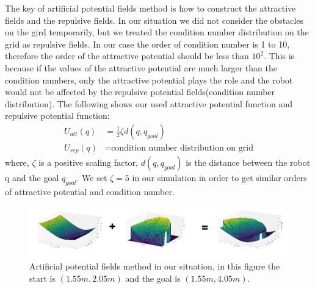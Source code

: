 The key of artificial potential fields method is how to construct the attractive fields and the repulsive fields. In our situation we did not consider the obstacles on the gird temporarily, but we treated the condition number distribution on the grid as repulsive fields. 
In our case the order of condition number is 1 to 10, therefore the order of the attractive potential should be less than $10^2$. This is because if the values of the attractive potential are much larger than the condition numbers, only the attractive potential plays the role and the robot would not be affected by the repulsive potential fields(condition number distribution). The following shows our used attractive potential function and repulsive potential function:
\begin{align*}
U_{att}(q) &= \frac{1}{2} \zeta d(q,q_{goal}) \\
U_{rep}(q) &= \text{condition number distribution on grid}
\end{align*}
where, $\zeta$ is a positive scaling factor, $d(q, q_{goal})$ is the distance between the robot q and the goal $q_{goal}$. We set $\zeta = 5$ in our simulation in order to get similar orders of attractive potential and condition number.


\begin{figure}[H]
\centering
\includegraphics[scale=0.6]{./fig/combine.png}
\caption{Artificial potential fields method in our situation, in this figure the start is $(1.55m,2.05m)$ and the goal is $(1.55m,4.05m)$.}
\label{fig:combine}
\end{figure}


